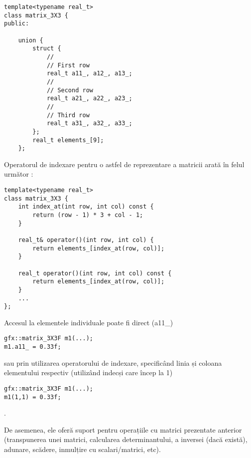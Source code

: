 \begin{lstlisting}
template<typename real_t>
class matrix_3X3 {
public:

    union {
        struct {
            //
            // First row
            real_t a11_, a12_, a13_;
            //
            // Second row
            real_t a21_, a22_, a23_;
            //
            // Third row
            real_t a31_, a32_, a33_;
        };
        real_t elements_[9];
    };

\end{lstlisting}
Operatorul de indexare pentru o astfel de reprezentare a matricii arată în felul
următor :
\begin{lstlisting}
template<typename real_t>
class matrix_3X3 {
    int index_at(int row, int col) const {
        return (row - 1) * 3 + col - 1;
    }

    real_t& operator()(int row, int col) {
        return elements_[index_at(row, col)];
    }

    real_t operator()(int row, int col) const {
        return elements_[index_at(row, col)];
    }
    ...
};
\end{lstlisting}

Accesul la elementele individuale poate fi direct (a11\_)
\begin{lstlisting}
gfx::matrix_3X3F m1(...);
m1.a11_ = 0.33f;
\end{lstlisting}
sau prin utilizarea operatorului de indexare, specificând linia și coloana
elementului respectiv (utilizând indecși care încep la 1)
\begin{lstlisting}
gfx::matrix_3X3F m1(...);
m1(1,1) = 0.33f;
\end{lstlisting}.
 
De asemenea, ele oferă suport pentru operațiile cu matrici prezentate
anterior (transpunerea unei matrici, calcularea determinantului, a inversei
(dacă există), adunare, scădere, inmulțire cu scalari/matrici, etc).

